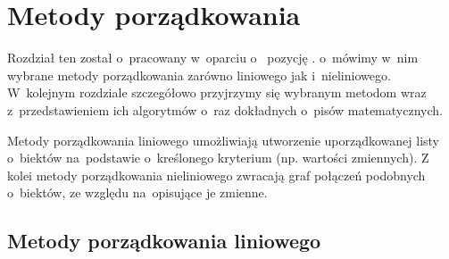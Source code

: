 \documentclass[12pt,a4paper]{report}
\newtheorem{definition}[theorem]{Definicja}
\newtheorem{example}{Przykład}
\begin{document}
%


\chapter{Metody porządkowania}\label{metody porzadkowania}
Rozdział ten został o~pracowany w~oparciu o~ pozycję \cite[Rozdział 2]{panek2013}. o~mówimy w~nim wybrane metody porządkowania zarówno liniowego jak i~nieliniowego. W~kolejnym rozdziale szczegółowo przyjrzymy się wybranym metodom wraz z~przedstawieniem ich algorytmów o~raz dokładnych o~pisów matematycznych. 

Metody porządkowania liniowego umożliwiają utworzenie uporządkowanej listy o~biektów na~podstawie o~kreślonego kryterium (np. wartości zmiennych). 
Z kolei metody porządkowania nieliniowego zwracają graf połączeń podobnych o~biektów, ze względu na~opisujące je zmienne. 

\section{Metody porządkowania liniowego}
\end{document}
